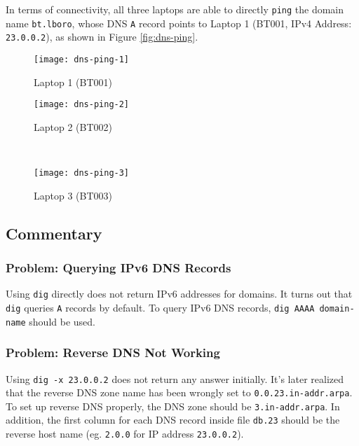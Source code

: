 In terms of connectivity, all three laptops are able to directly \texttt{ping} the domain name \texttt{bt.lboro}, whose DNS \texttt{A} record points to Laptop 1 (BT001, IPv4 Address: \texttt{23.0.0.2}), as shown in Figure \ref{fig:dns-ping}.

\begin{figure*}[ht!]
    \centering
    \begin{subfigure}[b]{0.67\textwidth}
        \centering
        \texttt{[image: dns-ping-1]}
        \caption{Laptop 1 (BT001)}
    \end{subfigure}
    \hfill
    \begin{minipage}[b]{0.3\textwidth}
	    \begin{subfigure}[b]{\linewidth}
	        \centering
	        \texttt{[image: dns-ping-2]}
	        \caption{Laptop 2 (BT002)}
	    \end{subfigure}
	    \\
	    \begin{subfigure}[b]{\linewidth}
	        \centering
	        \texttt{[image: dns-ping-3]}
	        \caption{Laptop 3 (BT003)}
	    \end{subfigure}
	\end{minipage}
    \caption{Connectivity to \texttt{bt.lboro} using \texttt{ping} on all $3$ Laptops.}
    \label{fig:dns-ping}
\end{figure*}








\subsection{Commentary}


\subsubsection{Problem: Querying IPv6 DNS Records}
Using \texttt{dig} directly does not return IPv6 addresses for domains. It turns out that \texttt{dig} queries \texttt{A} records by default. To query IPv6 DNS records, \texttt{dig AAAA domain-name} should be used.

\subsubsection{Problem: Reverse DNS Not Working}
Using \texttt{dig -x 23.0.0.2} does not return any answer initially.
It's later realized that the reverse DNS zone name has been wrongly set to \texttt{0.0.23.in-addr.arpa}.
To set up reverse DNS properly, the DNS zone should be \texttt{3.in-addr.arpa}. In addition, the first column for each DNS record inside file \texttt{db.23} should be the reverse host name (eg. \texttt{2.0.0} for IP address \texttt{23.0.0.2}). 



